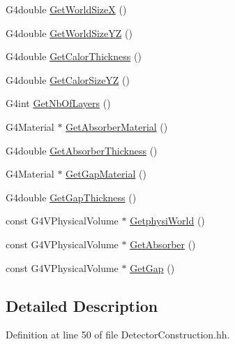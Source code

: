 \begin{DoxyCompactItemize}
\item 
G4double \hyperlink{class_detector_construction_a08c8ac2151ce1dd90d46f14f74377276}{Get\-World\-Size\-X} ()
\item 
G4double \hyperlink{class_detector_construction_a2179692a66c262ebfdbf86f122264ff6}{Get\-World\-Size\-Y\-Z} ()
\item 
G4double \hyperlink{class_detector_construction_a9ed9cc2835f90b9c22b509afbc298775}{Get\-Calor\-Thickness} ()
\item 
G4double \hyperlink{class_detector_construction_a4b4ad895c4474577545bed10dea24a4d}{Get\-Calor\-Size\-Y\-Z} ()
\item 
G4int \hyperlink{class_detector_construction_a5b3b5f7a167a60774b2907181f4ead69}{Get\-Nb\-Of\-Layers} ()
\item 
G4\-Material $\ast$ \hyperlink{class_detector_construction_aec146766fd21440aef4e52b03e9b1151}{Get\-Absorber\-Material} ()
\item 
G4double \hyperlink{class_detector_construction_a7d3cce8b138380c178cab2065d2f02c5}{Get\-Absorber\-Thickness} ()
\item 
G4\-Material $\ast$ \hyperlink{class_detector_construction_aa85d1cf09a67505d561814dc06c0934f}{Get\-Gap\-Material} ()
\item 
G4double \hyperlink{class_detector_construction_ac0ec9c5c2273b936d68da16ef8efeda9}{Get\-Gap\-Thickness} ()
\item 
const G4\-V\-Physical\-Volume $\ast$ \hyperlink{class_detector_construction_a7ac14b0a6550779fe6ec481d13730f37}{Getphysi\-World} ()
\item 
const G4\-V\-Physical\-Volume $\ast$ \hyperlink{class_detector_construction_ad893a559f7b2b8319df6e81c4b29f764}{Get\-Absorber} ()
\item 
const G4\-V\-Physical\-Volume $\ast$ \hyperlink{class_detector_construction_aeccad9335e5931ad8fe30182dc61860b}{Get\-Gap} ()
\end{DoxyCompactItemize}


\subsection{Detailed Description}


Definition at line 50 of file Detector\-Construction.\-hh.



